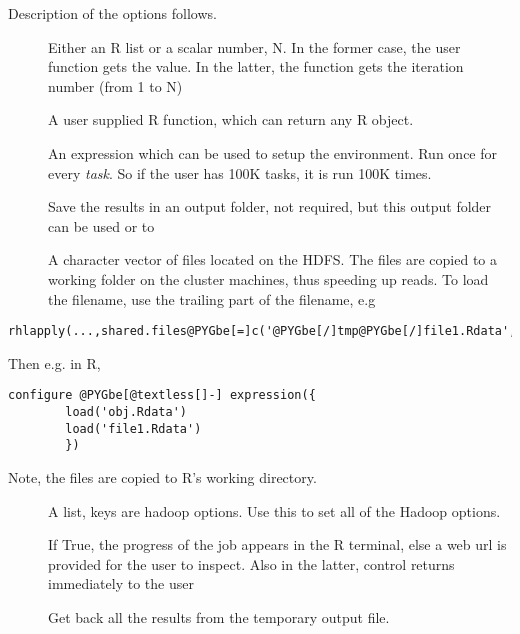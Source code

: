 \documentclass[letterpaper,10pt,english]{manual}
\begin{document}
Description of the options follows.
\begin{description}
\item[]
Either an R list or a scalar number, N. In the former case, the
user function gets the value. In the latter, the function gets
the iteration number (from 1 to N)

\item[]
A user supplied R function, which can return any R object.

\item[]
An expression which can be used to setup the environment. Run
once for every \emph{task}. So if the user has 100K tasks, it is run
100K times.

\item[]
Save the results in an output folder, not required, but this
output folder can be used  or to 

\item[]
A character vector of files located on the HDFS. The files are
copied to a working folder on the cluster machines, thus
speeding up reads. To load the filename, use the trailing part
of the filename, e.g

\end{description}

\begin{Verbatim}[commandchars=@\[\]]
rhlapply(...,shared.files@PYGbe[=]c('@PYGbe[/]tmp@PYGbe[/]file1.Rdata','@PYGbe[/]user@PYGbe[/]me@PYGbe[/]obj.Rdata'))
\end{Verbatim}

Then e.g. in R,

\begin{Verbatim}[commandchars=@\[\]]
configure @PYGbe[@textless[]-] expression({
        load('obj.Rdata')
        load('file1.Rdata')
        })
\end{Verbatim}

Note, the files are copied to R's working directory.
\begin{description}
\item[]
A list, keys are hadoop options. Use this to set all of the
Hadoop options.

\item[]
If True, the progress of the job appears in the R terminal,
else a web url is provided for the user to inspect. Also in
the latter, control returns immediately to the user

\item[]
Get back all the results from the temporary output file.

\end{description}
\end{document}
